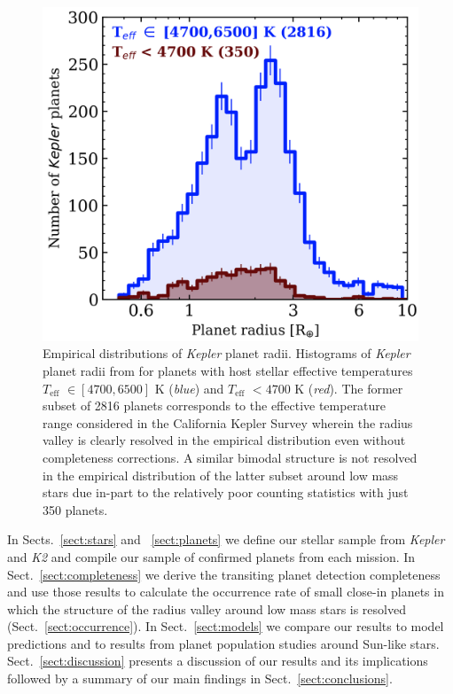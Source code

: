 \documentclass[twocolumn]{emulateapj}
\newcommand{\kepler}[1]{\emph{Kepler}#1}
\newcommand{\ktwo}[1]{\emph{K2}#1}
\newcommand{\teff}[1]{$T_{\text{eff}}$#1}
\begin{document}
\begin{figure}
  \centering
  \includegraphics[width=0.98\hsize]{figures/Bergerplanethist.png}
  \caption{Empirical distributions of \kepler{} planet radii. Histograms of \kepler{} planet radii
    from \cite{berger18} for planets with host stellar effective temperatures \teff{} $\in [4700,6500]$ K
    (\emph{blue}) and \teff{} $<4700$ K (\emph{red}). The former subset of 2816 planets corresponds to the
    effective temperature range considered in the California Kepler Survey \citep{fulton17}
    wherein the radius valley is clearly
    resolved in the empirical distribution even without completeness corrections. A similar bimodal
    structure is not resolved in the empirical distribution of the latter subset around low mass stars
    due in-part to the relatively poor counting statistics with just 350 planets.}
  \label{fig:berger}
\end{figure}


In Sects.~\ref{sect:stars} and ~\ref{sect:planets} we define our stellar sample from \kepler{} and \ktwo{}
and compile our sample of confirmed planets from each mission.
In Sect.~\ref{sect:completeness} we derive the transiting planet detection completeness and use those results
to calculate the occurrence rate of small close-in planets in which the structure of the radius valley around
low mass stars is resolved (Sect.~\ref{sect:occurrence}). In Sect.~\ref{sect:models} we compare our results to
model predictions and to results from planet population studies around Sun-like stars. 
Sect.~\ref{sect:discussion} presents a discussion of our results
and its implications followed by a summary of our main findings in Sect.~\ref{sect:conclusions}.
\end{document}
